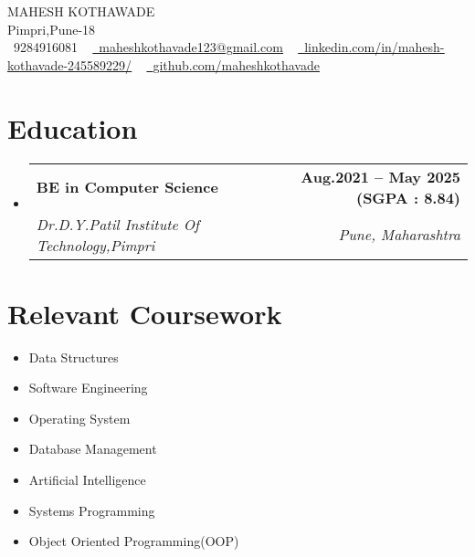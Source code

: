 \documentclass[letterpaper,11pt]{article}
\makeatletter
\newcommand{\resumeSubheading}[4]{
  \vspace{-2pt}\item
    \begin{tabular*}{1.0\textwidth}[t]{l@{\extracolsep{\fill}}r}
      \textbf{#1} & \textbf{\small #2} \\
      \textit{\small#3} & \textit{\small #4} \\
    \end{tabular*}\vspace{-7pt}
}
\newcommand{\resumeSubHeadingListStart}{\begin{itemize}[leftmargin=0.0in, label={}]}
\newcommand{\resumeSubHeadingListEnd}{\end{itemize}}
\makeatother
\begin{document}

\begin{center}
    {\Huge \scshape MAHESH KOTHAWADE} \\ \vspace{1pt}
    Pimpri,Pune-18 \\ \vspace{1pt}
    \small \raisebox{-0.1\height}\faPhone\ 9284916081 ~ \href{mailto:x@gmail.com}{\raisebox{-0.2\height}\faEnvelope\  \underline{maheshkothavade123@gmail.com}} ~ 
    \href{https://linkedin.com/in//}{\raisebox{-0.2\height}\faLinkedin\ \underline{linkedin.com/in/mahesh-kothavade-245589229/}}  ~
    \href{https://github.com/}{\raisebox{-0.2\height}\faGithub\ \underline{github.com/maheshkothavade}}
    \vspace{-8pt}
\end{center}


\section{Education}
  \resumeSubHeadingListStart
    \resumeSubheading
      {BE in Computer Science}{Aug.2021 -- May 2025 (SGPA : 8.84)}
      {Dr.D.Y.Patil Institute Of Technology,Pimpri}{Pune, Maharashtra}
      
  \resumeSubHeadingListEnd

\section{Relevant Coursework}
        \begin{multicols}{4}
            \begin{itemize}[itemsep=-5pt, parsep=3pt]
                \item\small Data Structures
                \item Software Engineering
                \item Operating System
                \item Database Management
                \item Artificial Intelligence
                \item Systems Programming
                \item Object Oriented Programming(OOP)
            \end{itemize}
        \end{multicols}
        \vspace*{2.0\multicolsep}
\end{document}
